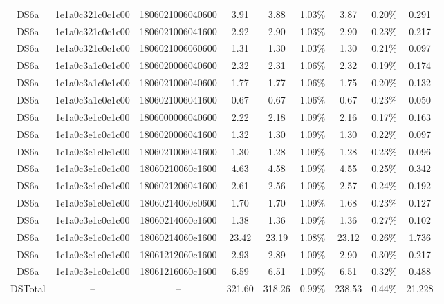 \begin{tabular}{|c|c c|c|c c|c c|c|}
  DS6a & 1e1a0c321c0c1c00 & 1806021006040600 & 3.91 & 3.88 & 1.03\% & 3.87 & 0.20\% & 0.291 \\
  DS6a & 1e1a0c321c0c1c00 & 1806021006041600 & 2.92 & 2.90 & 1.03\% & 2.90 & 0.23\% & 0.217 \\
  DS6a & 1e1a0c321c0c1c00 & 1806021006060600 & 1.31 & 1.30 & 1.03\% & 1.30 & 0.21\% & 0.097 \\
  DS6a & 1e1a0c3a1c0c1c00 & 1806020006040600 & 2.32 & 2.31 & 1.06\% & 2.32 & 0.19\% & 0.174 \\
  DS6a & 1e1a0c3a1c0c1c00 & 1806021006040600 & 1.77 & 1.77 & 1.06\% & 1.75 & 0.20\% & 0.132 \\
  DS6a & 1e1a0c3a1c0c1c00 & 1806021006041600 & 0.67 & 0.67 & 1.06\% & 0.67 & 0.23\% & 0.050 \\
  DS6a & 1e1a0c3e1c0c1c00 & 1806000006040600 & 2.22 & 2.18 & 1.09\% & 2.16 & 0.17\% & 0.163 \\
  DS6a & 1e1a0c3e1c0c1c00 & 1806020006041600 & 1.32 & 1.30 & 1.09\% & 1.30 & 0.22\% & 0.097 \\
  DS6a & 1e1a0c3e1c0c1c00 & 1806021006041600 & 1.30 & 1.28 & 1.09\% & 1.28 & 0.23\% & 0.096 \\
  DS6a & 1e1a0c3e1c0c1c00 & 18060210060c1600 & 4.63 & 4.58 & 1.09\% & 4.55 & 0.25\% & 0.342 \\
  DS6a & 1e1a0c3e1c0c1c00 & 1806021206041600 & 2.61 & 2.56 & 1.09\% & 2.57 & 0.24\% & 0.192 \\
  DS6a & 1e1a0c3e1c0c1c00 & 18060214060c0600 & 1.70 & 1.70 & 1.09\% & 1.68 & 0.23\% & 0.127 \\
  DS6a & 1e1a0c3e1c0c1c00 & 18060214060c1600 & 1.38 & 1.36 & 1.09\% & 1.36 & 0.27\% & 0.102 \\
  DS6a & 1e1a0c3e1c0c1c00 & 18060214060e1600 & 23.42 & 23.19 & 1.08\% & 23.12 & 0.26\% & 1.736 \\
  DS6a & 1e1a0c3e1c0c1c00 & 18061212060c1600 & 2.93 & 2.89 & 1.09\% & 2.90 & 0.30\% & 0.217 \\
  DS6a & 1e1a0c3e1c0c1c00 & 18061216060c1600 & 6.59 & 6.51 & 1.09\% & 6.51 & 0.32\% & 0.488 \\
  DSTotal & -- & -- & 321.60 & 318.26 & 0.99\% & 238.53 & 0.44\% & 21.228 \\
\hline
\end{tabular}
